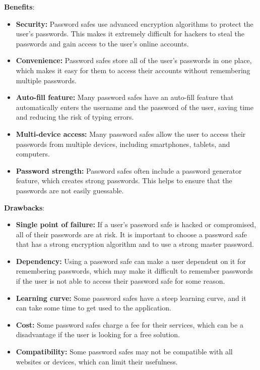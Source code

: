 \documentclass[conference]{IEEEtran}
\begin{document}
\textbf{Benefits}:
\begin{itemize}
    \item \textbf{Security:} Password safes use advanced encryption algorithms to protect the user's passwords. This makes it extremely difficult for hackers to steal the passwords and gain access to the user's online accounts. 
    \item \textbf{Convenience:} Password safes store all of the user's passwords in one place, which makes it easy for them to access their accounts without remembering multiple passwords.
    \item \textbf{Auto-fill feature:} Many password safes have an auto-fill feature that automatically enters the username and the password of the user, saving time and reducing the risk of typing errors.
    \item \textbf{Multi-device access:} Many password safes allow the user to access their passwords from multiple devices, including smartphones, tablets, and computers.
    \item \textbf{Password strength:} Password safes often include a password generator feature, which creates strong passwords. This helps to ensure that the passwords are not easily guessable.
\end{itemize}

\textbf{Drawbacks}:
\begin{itemize}
    \item \textbf{Single point of failure:} If a user's password safe is hacked or compromised, all of their passwords are at risk. It is important to choose a password safe that has a strong encryption algorithm and to use a strong master password.
    \item \textbf{Dependency:} Using a password safe can make a user dependent on it for remembering passwords, which may make it difficult to remember passwords if the user is not able to access their password safe for some reason.
    \item \textbf{Learning curve:} Some password safes have a steep learning curve, and it can take some time to get used to the application.
    \item \textbf{Cost:} Some password safes charge a fee for their services, which can be a disadvantage if the user is looking for a free solution.
    \item \textbf{Compatibility:} Some password safes may not be compatible with all websites or devices, which can limit their usefulness.
\end{itemize}
\end{document}
